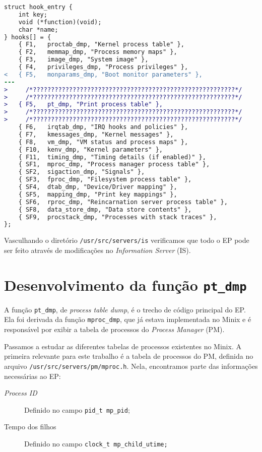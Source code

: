 \documentclass[brazil, a4paper]{scrartcl}
\begin{document}
\begin{lstlisting}[language=diff]
struct hook_entry {
	int key;
	void (*function)(void);
	char *name;
} hooks[] = {
	{ F1, 	proctab_dmp, "Kernel process table" },
	{ F2,   memmap_dmp, "Process memory maps" },
	{ F3,	image_dmp, "System image" },
	{ F4,	privileges_dmp, "Process privileges" },
< 	{ F5,	monparams_dmp, "Boot monitor parameters" },
---
>     /*????????????????????????????????????????????????????????*/
>     /*????????????????????????????????????????????????????????*/
> 	{ F5,	pt_dmp, "Print process table" },
>     /*????????????????????????????????????????????????????????*/
>     /*????????????????????????????????????????????????????????*/
	{ F6,	irqtab_dmp, "IRQ hooks and policies" },
	{ F7,	kmessages_dmp, "Kernel messages" },
	{ F8,	vm_dmp, "VM status and process maps" },
	{ F10,	kenv_dmp, "Kernel parameters" },
	{ F11,	timing_dmp, "Timing details (if enabled)" },
	{ SF1,	mproc_dmp, "Process manager process table" },
	{ SF2,	sigaction_dmp, "Signals" },
	{ SF3,	fproc_dmp, "Filesystem process table" },
	{ SF4,	dtab_dmp, "Device/Driver mapping" },
	{ SF5,	mapping_dmp, "Print key mappings" },
	{ SF6,	rproc_dmp, "Reincarnation server process table" },
	{ SF8,  data_store_dmp, "Data store contents" },
	{ SF9,  procstack_dmp, "Processes with stack traces" },
};
\end{lstlisting}

Vasculhando o diretório \texttt{/usr/src/servers/is} verificamos que todo o EP
pode ser feito através de modificações no \emph{Information Server} (IS).

\section{Desenvolvimento da função \texttt{pt\_dmp}}
A função \texttt{pt\_dmp}, de \emph{process table dump}, é o trecho de código
principal do EP. Ela foi derivada da função \texttt{mproc\_dmp}, que já estava
implementada no Minix e é responsável por exibir a tabela de processos do
\emph{Process Manager} (PM).

Passamos a estudar as diferentes tabelas de processos existentes no Minix. A
primeira relevante para este trabalho é a tabela de processos do PM, definida
no arquivo \texttt{/usr/src/servers/pm/mproc.h}. Nela, encontramos parte das
informações necessárias ao EP:

\begin{description}
	\item[\emph{Process ID}] Definido no campo \texttt{pid\_t mp\_pid};
	\item[Tempo dos filhos] Definido no campo \texttt{clock\_t mp\_child\_utime;}
\end{description}
\end{document}

